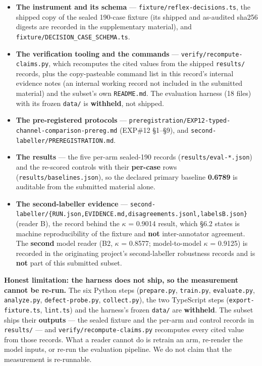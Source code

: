 \documentclass[10pt]{article}
\begin{document}
\begin{itemize}
\item \textbf{The instrument and its schema} --- \texttt{fixture/reflex-decisions.ts}, the shipped copy of the sealed 190-case fixture (its shipped and as-audited sha256 digests are recorded in the supplementary material), and \texttt{fixture/DECISION\_CASE\_SCHEMA.ts}.
\item \textbf{The verification tooling and the commands} --- \texttt{verify/recompute-claims.py}, which recomputes the cited values from the shipped \texttt{results/} records, plus the copy-pasteable command list in this record's internal evidence notes (an internal working record not included in the submitted material) and the subset's own \texttt{README.md}. The evaluation harness (18 files) with its frozen \texttt{data/} is \textbf{withheld}, not shipped.
\item \textbf{The pre-registered protocols} --- \texttt{preregistration/EXP12-typed-channel-comparison-prereg.md} (EXP\#12 \S1--\S9), and \texttt{second-labeller/PREREGISTRATION.md}.
\item \textbf{The results} --- the five per-arm sealed-190 records (\texttt{results/eval-*.json}) and the re-scored controls with their \textbf{per-case} rows (\texttt{results/baselines.json}), so the declared primary baseline \textbf{0.6789} is auditable from the submitted material alone.
\item \textbf{The second-labeller evidence} --- \texttt{second-labeller/\{RUN.json,EVIDENCE.md,disagreements.jsonl,labelsB.json\}} (reader B), the record behind the $\kappa$ = 0.9014 result, which \S6.2 states is machine reproducibility of the fixture and \textbf{not} inter-annotator agreement. The \textbf{second} model reader (B2, $\kappa$ = 0.8577; model-to-model $\kappa$ = 0.9125) is recorded in the originating project's second-labeller robustness records and is \textbf{not} part of this submitted subset.
\end{itemize}

\textbf{Honest limitation: the harness does not ship, so the measurement cannot be re-run.} The six Python steps (\texttt{prepare.py}, \texttt{train.py}, \texttt{evaluate.py}, \texttt{analyze.py}, \texttt{defect-probe.py}, \texttt{collect.py}), the two TypeScript steps (\texttt{export-fixture.ts}, \texttt{lint.ts}) and the harness's frozen \texttt{data/} are \textbf{withheld}. The subset ships their \textbf{outputs} --- the sealed fixture and the per-arm and control records in \texttt{results/} --- and \texttt{verify/recompute-claims.py} recomputes every cited value from those records. What a reader cannot do is retrain an arm, re-render the model inputs, or re-run the evaluation pipeline. We do not claim that the measurement is re-runnable.
\end{document}
